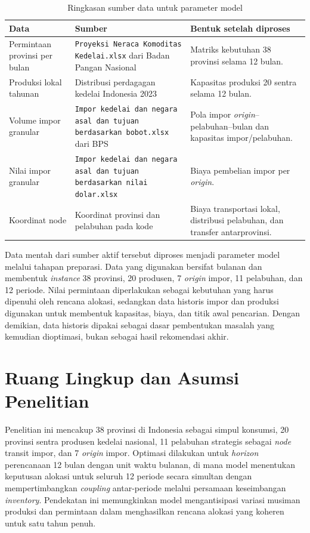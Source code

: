 \documentclass{file/TA-ITS}
\theoremstyle{definition}
\theoremstyle{definition}
\theoremstyle{plain}
\begin{document}
\begin{table}[H]
\centering
\caption{Ringkasan sumber data untuk parameter model}
\label{tab:sumber_data_bab3}
\footnotesize
\begin{tabularx}{\textwidth}{@{}p{}p{}X@{}}
\toprule
\textbf{Data} & \textbf{Sumber} & \textbf{Bentuk setelah diproses} \\
\midrule
Permintaan provinsi per bulan & \texttt{Proyeksi Neraca Komoditas Kedelai.xlsx} dari Badan Pangan Nasional & Matriks kebutuhan 38 provinsi selama 12 bulan. \\
Produksi lokal tahunan & Distribusi perdagagan kedelai Indonesia 2023 & Kapasitas produksi 20 sentra selama 12 bulan. \\
Volume impor granular & \texttt{Impor kedelai dan negara asal dan tujuan berdasarkan bobot.xlsx} dari BPS & Pola impor \textit{origin}--pelabuhan--bulan dan kapasitas impor/pelabuhan. \\
Nilai impor granular & \texttt{Impor kedelai dan negara asal dan tujuan berdasarkan nilai dolar.xlsx} & Biaya pembelian impor per \textit{origin}. \\
Koordinat node & Koordinat provinsi dan pelabuhan pada kode & Biaya transportasi lokal, distribusi pelabuhan, dan transfer antarprovinsi. \\
\bottomrule
\end{tabularx}
\end{table}
Data mentah dari sumber aktif tersebut diproses menjadi parameter model melalui tahapan preparasi. Data yang digunakan bersifat bulanan dan membentuk \textit{instance} 38 provinsi, 20 produsen, 7 \textit{origin} impor, 11 pelabuhan, dan 12 periode. Nilai permintaan diperlakukan sebagai kebutuhan yang harus dipenuhi oleh rencana alokasi, sedangkan data historis impor dan produksi digunakan untuk membentuk kapasitas, biaya, dan titik awal pencarian. Dengan demikian, data historis dipakai sebagai dasar pembentukan masalah yang kemudian dioptimasi, bukan sebagai hasil rekomendasi akhir.

\section{Ruang Lingkup dan Asumsi Penelitian}

Penelitian ini mencakup 38 provinsi di Indonesia sebagai simpul konsumsi, 20 provinsi sentra produsen kedelai nasional, 11 pelabuhan strategis sebagai \textit{node} transit impor, dan 7 \textit{origin} impor. Optimasi dilakukan untuk \textit{horizon} perencanaan 12 bulan dengan unit waktu bulanan, di mana model menentukan keputusan alokasi untuk seluruh 12 periode secara simultan dengan mempertimbangkan \textit{coupling} antar-periode melalui persamaan keseimbangan \textit{inventory}. Pendekatan ini memungkinkan model mengantisipasi variasi musiman produksi dan permintaan dalam menghasilkan rencana alokasi yang koheren untuk satu tahun penuh.
\end{document}
